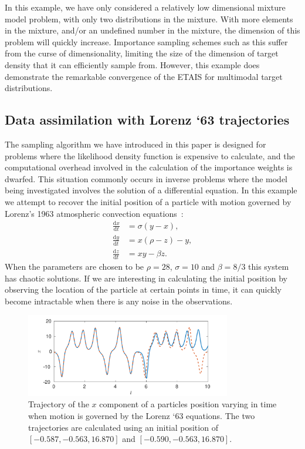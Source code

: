 \documentclass[final]{siamltex}
\begin{document}
In this example, we have only considered a relatively low dimensional
mixture model problem, with only two distributions in the
mixture. With more elements in the mixture, and/or an undefined number
in the mixture, the dimension of this problem will quickly
increase. Importance sampling schemes such as this suffer from the
curse of dimensionality, limiting the size of the dimension of target
density that it can efficiently sample from. However, this example
does demonstrate the remarkable convergence of the ETAIS for multimodal
target distributions.

\subsection{Data assimilation with Lorenz `63 trajectories}\label{sec:lorenz}

The sampling algorithm we have introduced in this paper is designed for problems where the likelihood density function is expensive to calculate, and the computational overhead involved in the calculation of the importance weights is dwarfed. This situation commonly occurs in inverse problems where the model being investigated involves the solution of a differential equation. In this example we attempt to recover the initial position of a particle with motion governed by Lorenz's 1963 atmospheric convection equations~\cite{lorenz1963deterministic}:
\begin{align*}
	\frac{\text{d}x}{\text{d}t} &= \sigma(y-x), \\
	\frac{\text{d}y}{\text{d}t} &= x(\rho-z)-y, \\
	\frac{\text{d}z}{\text{d}t} &= xy - \beta z.
\end{align*}
When the parameters are chosen to be $\rho = 28$, $\sigma=10$ and $\beta=8/3$ this system has chaotic solutions. If we are interesting in calculating the initial position by observing the location of the particle at certain points in time, it can quickly become intractable when there is any noise in the observations.

\begin{figure}[htb]
\centering
\includegraphics[width=0.8\textwidth]{"figures/Lorenz_xtraj"}
\caption{Trajectory of the $x$ component of a particles position varying in time when motion is governed by the Lorenz `63 equations. The two trajectories are calculated using an initial position of $[-0.587,-0.563,16.870]$ and $[-0.590,-0.563,16.870]$.}
\label{fig:Lorenz_xtraj}
\end{figure}
\end{document}
